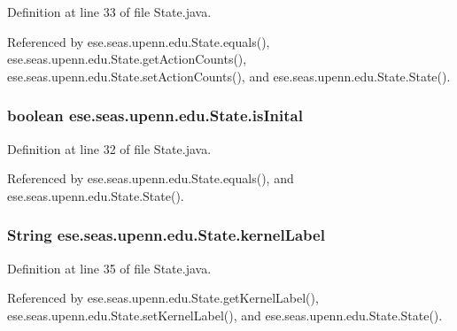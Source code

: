 Definition at line 33 of file State.\+java.



Referenced by ese.\+seas.\+upenn.\+edu.\+State.\+equals(), ese.\+seas.\+upenn.\+edu.\+State.\+get\+Action\+Counts(), ese.\+seas.\+upenn.\+edu.\+State.\+set\+Action\+Counts(), and ese.\+seas.\+upenn.\+edu.\+State.\+State().

\hypertarget{classese_1_1seas_1_1upenn_1_1edu_1_1_state_aabc06e5afd914e3292820fd9fab31ceb}{}
\subsubsection[{is\+Inital}]{\setlength{\rightskip}{0pt plus 5cm}boolean ese.\+seas.\+upenn.\+edu.\+State.\+is\+Inital\hspace{0.3cm}{\ttfamily [private]}}\label{classese_1_1seas_1_1upenn_1_1edu_1_1_state_aabc06e5afd914e3292820fd9fab31ceb}


Definition at line 32 of file State.\+java.



Referenced by ese.\+seas.\+upenn.\+edu.\+State.\+equals(), and ese.\+seas.\+upenn.\+edu.\+State.\+State().

\hypertarget{classese_1_1seas_1_1upenn_1_1edu_1_1_state_a1988575cfbba31954fdf6e531da5755b}{}
\subsubsection[{kernel\+Label}]{\setlength{\rightskip}{0pt plus 5cm}String ese.\+seas.\+upenn.\+edu.\+State.\+kernel\+Label\hspace{0.3cm}{\ttfamily [private]}}\label{classese_1_1seas_1_1upenn_1_1edu_1_1_state_a1988575cfbba31954fdf6e531da5755b}


Definition at line 35 of file State.\+java.



Referenced by ese.\+seas.\+upenn.\+edu.\+State.\+get\+Kernel\+Label(), ese.\+seas.\+upenn.\+edu.\+State.\+set\+Kernel\+Label(), and ese.\+seas.\+upenn.\+edu.\+State.\+State().

